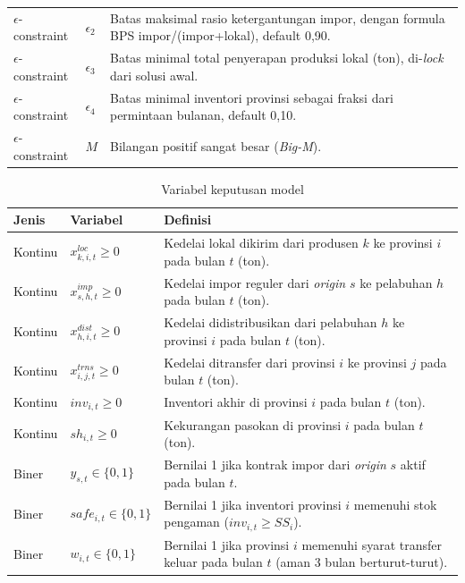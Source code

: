 \documentclass{file/TA-ITS}
\theoremstyle{definition}
\theoremstyle{definition}
\theoremstyle{plain}
\begin{document}
\begin{table}[H]
\begin{tabularx}{\textwidth}{@{}p{}p{}X@{}}
\(\epsilon\)-constraint & $\epsilon_2$ & Batas maksimal rasio ketergantungan impor, dengan formula BPS impor/(impor+lokal), default 0,90. \\
\(\epsilon\)-constraint & $\epsilon_3$ & Batas minimal total penyerapan produksi lokal (ton), di-\textit{lock} dari solusi awal. \\
\(\epsilon\)-constraint & $\epsilon_4$ & Batas minimal inventori provinsi sebagai fraksi dari permintaan bulanan, default 0,10. \\
\(\epsilon\)-constraint & $M$ & Bilangan positif sangat besar (\textit{Big-M}). \\
\bottomrule
\end{tabularx}
\renewcommand{\arraystretch}{1}
\end{table}

\begin{table}[H]
\centering
\caption{Variabel keputusan model}
\label{tab:model_variables}
\scriptsize
\renewcommand{\arraystretch}{1.08}
\begin{tabularx}{\textwidth}{@{}p{}p{}X@{}}
\toprule
\textbf{Jenis} & \textbf{Variabel} & \textbf{Definisi} \\
\midrule
Kontinu & $x^{loc}_{k,i,t} \geq 0$ & Kedelai lokal dikirim dari produsen $k$ ke provinsi $i$ pada bulan $t$ (ton). \\
Kontinu & $x^{imp}_{s,h,t} \geq 0$ & Kedelai impor reguler dari \textit{origin} $s$ ke pelabuhan $h$ pada bulan $t$ (ton). \\
Kontinu & $x^{dist}_{h,i,t} \geq 0$ & Kedelai didistribusikan dari pelabuhan $h$ ke provinsi $i$ pada bulan $t$ (ton). \\
Kontinu & $x^{trns}_{i,j,t} \geq 0$ & Kedelai ditransfer dari provinsi $i$ ke provinsi $j$ pada bulan $t$ (ton). \\
Kontinu & $inv_{i,t} \geq 0$ & Inventori akhir di provinsi $i$ pada bulan $t$ (ton). \\
Kontinu & $sh_{i,t} \geq 0$ & Kekurangan pasokan di provinsi $i$ pada bulan $t$ (ton). \\
Biner & $y_{s,t} \in \{0,1\}$ & Bernilai 1 jika kontrak impor dari \textit{origin} $s$ aktif pada bulan $t$. \\
Biner & $safe_{i,t} \in \{0,1\}$ & Bernilai 1 jika inventori provinsi $i$ memenuhi stok pengaman ($inv_{i,t} \geq SS_i$). \\
Biner & $w_{i,t} \in \{0,1\}$ & Bernilai 1 jika provinsi $i$ memenuhi syarat transfer keluar pada bulan $t$ (aman 3 bulan berturut-turut). \\
\bottomrule
\end{tabularx}
\renewcommand{\arraystretch}{1}
\end{table}
\end{document}
